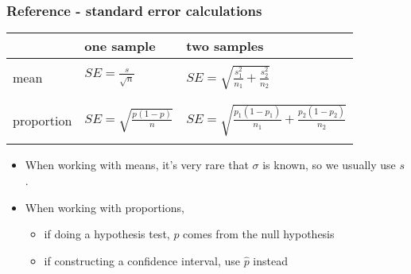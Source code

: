 \documentclass[slidestop,compress,mathserif]{beamer}
\begin{document}
\begin{frame}
\frametitle{Reference - standard error calculations}

\begin{center}
\begin{tabular}{l | l | l}
			& one sample					& two samples \\ 
\hline
& & \\
mean		& $SE = \frac{s}{\sqrt{n}}$			& $SE = \sqrt{ \frac{s_1^2}{n_1} + \frac{s_2^2}{n_2}}$ \\
& & \\
\hline
& & \\
proportion		& $SE = \sqrt{ \frac{p(1-p)}{n} }$	& $SE = \sqrt{ \frac{p_1(1-p_1)}{n_1} + \frac{p_2(1-p_2)}{n_2} }$	 \\	
& & \\
\end{tabular}
\end{center}

\pause

\begin{itemize}

\item When working with means, it's very rare that $\sigma$ is known, so we usually use $s$.

\pause

\item When working with proportions, 
\begin{itemize}
\item if doing a hypothesis test, $p$ comes from the null hypothesis
\item if constructing a confidence interval, use $\hat{p}$ instead
\end{itemize}

\end{itemize}

\end{frame}


\end{document}
